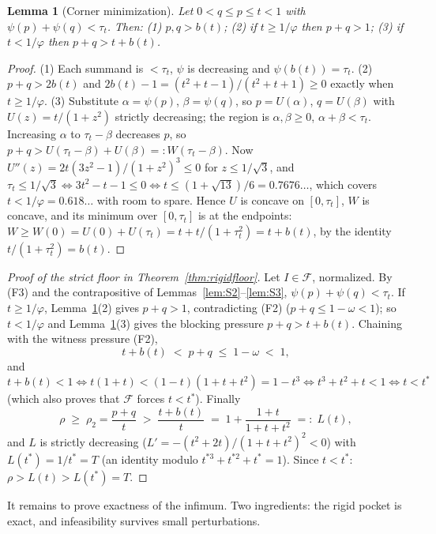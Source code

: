 \documentclass[11pt]{article}
\newtheorem{lemma}[theorem]{Lemma}
\theoremstyle{definition}
\begin{document}
\begin{lemma}[Corner minimization]\label{lem:S4}
Let $0<q\le p\le t<1$ with $\psi(p)+\psi(q)<\tau_t$. Then:
\textup{(1)} $p,q>b(t)$;
\textup{(2)} if $t\ge1/\varphi$ then $p+q>1$;
\textup{(3)} if $t<1/\varphi$ then $p+q>t+b(t)$.
\end{lemma}
\begin{proof}
(1) Each summand is $<\tau_t$, $\psi$ is decreasing and $\psi(b(t))=\tau_t$.
(2) $p+q>2b(t)$ and $2b(t)-1=(t^2+t-1)/(t^2+t+1)\ge0$ exactly when
$t\ge1/\varphi$.
(3) Substitute $\alpha=\psi(p)$, $\beta=\psi(q)$, so $p=U(\alpha)$,
$q=U(\beta)$ with $U(z)=t/(1+z^2)$ strictly decreasing; the region is
$\alpha,\beta\ge0$, $\alpha+\beta<\tau_t$. Increasing $\alpha$ to
$\tau_t-\beta$ decreases $p$, so $p+q>U(\tau_t-\beta)+U(\beta)=:W(\tau_t-\beta)$.
Now $U''(z)=2t(3z^2-1)/(1+z^2)^3\le0$ for $z\le1/\sqrt3$, and
$\tau_t\le1/\sqrt3\iff3t^2-t-1\le0\iff t\le(1+\sqrt{13})/6=0.7676\dots$,
which covers $t<1/\varphi=0.618\dots$ with room to spare. Hence $U$ is
concave on $[0,\tau_t]$, $W$ is concave, and its minimum over $[0,\tau_t]$ is
at the endpoints: $W\ge W(0)=U(0)+U(\tau_t)=t+t/(1+\tau_t^2)=t+b(t)$, by the
identity $t/(1+\tau_t^2)=b(t)$.
\end{proof}

\begin{proof}[Proof of the strict floor in Theorem~\ref{thm:rigidfloor}]
Let $I\in\mathcal F$, normalized. By (F3) and the contrapositive of
Lemmas~\ref{lem:S2}--\ref{lem:S3}, $\psi(p)+\psi(q)<\tau_t$. If
$t\ge1/\varphi$, Lemma~\ref{lem:S4}(2) gives $p+q>1$, contradicting (F2)
($p+q\le1-\omega<1$); so $t<1/\varphi$ and Lemma~\ref{lem:S4}(3) gives the
blocking pressure $p+q>t+b(t)$. Chaining with the witness pressure (F2),
\[
t+b(t)\;<\;p+q\;\le\;1-\omega\;<\;1,
\]
and $t+b(t)<1\iff t(1+t)<(1-t)(1+t+t^2)=1-t^3\iff t^3+t^2+t<1\iff t<t^{*}$
(which also proves that $\mathcal F$ forces $t<t^{*}$). Finally
\[
\rho\;\ge\;\rho_2=\frac{p+q}{t}\;>\;\frac{t+b(t)}{t}
\;=\;1+\frac{1+t}{1+t+t^2}\;=:\;L(t),
\]
and $L$ is strictly decreasing ($L'=-(t^2+2t)/(1+t+t^2)^2<0$) with
$L(t^{*})=1/t^{*}=T$ (an identity modulo $t^{*3}+t^{*2}+t^{*}=1$). Since
$t<t^{*}$: $\rho>L(t)>L(t^{*})=T$.
\end{proof}

It remains to prove exactness of the infimum. Two ingredients: the rigid
pocket is exact, and infeasibility survives small perturbations.
\end{document}

